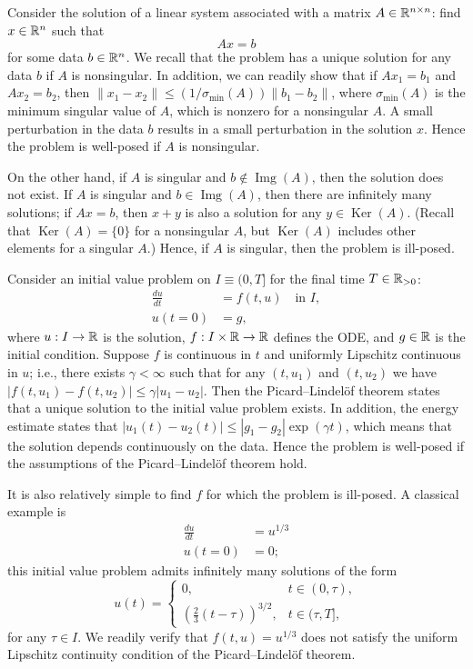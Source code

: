 \begin{example}
    Consider the solution of a linear system associated with a matrix $A \in \mathbb{R}^{n \times n}$: find $x \in \mathbb{R}^n$ such that
    \[Ax = b\]
    for some data $b \in \mathbb{R}^n$. We recall that the problem has a unique solution for any data $b$ if $A$ is nonsingular. In addition, we can readily show that if $Ax_1 = b_1$ and $Ax_2 = b_2$, then $\|x_1 - x_2\| \leq (1/\sigma_{\min}(A)) \|b_1 - b_2\|$, where $\sigma_{\min}(A)$ is the minimum singular value of $A$, which is nonzero for a nonsingular $A$. A small perturbation in the data $b$ results in a small perturbation in the solution $x$. Hence the problem is well-posed if $A$ is nonsingular.

    On the other hand, if $A$ is singular and $b \notin \operatorname{Img}(A)$, then the solution does not exist. If $A$ is singular and $b \in \operatorname{Img}(A)$, then there are infinitely many solutions; if $Ax = b$, then $x + y$ is also a solution for any $y \in \operatorname{Ker}(A)$. (Recall that $\operatorname{Ker}(A) = \{0\}$ for a nonsingular $A$, but $\operatorname{Ker}(A)$ includes other elements for a singular $A$.) Hence, if $A$ is singular, then the problem is ill-posed.
\end{example}

\begin{example}
    Consider an initial value problem on $I \equiv (0, T]$ for the final time $T \in \mathbb{R}_{>0}$:
    \begin{align*}
        \frac{du}{dt} &= f(t, u) \quad \text{in } I, \\
        u(t = 0) &= g,
    \end{align*}
    where $u : I \to \mathbb{R}$ is the solution, $f : I \times \mathbb{R} \to \mathbb{R}$ defines the ODE, and $g \in \mathbb{R}$ is the initial condition. Suppose $f$ is continuous in $t$ and uniformly Lipschitz continuous in $u$; i.e., there exists $\gamma < \infty$ such that for any $(t, u_1)$ and $(t, u_2)$ we have $|f(t, u_1) - f(t, u_2)| \leq \gamma |u_1 - u_2|$. Then the Picard--Lindel\"of theorem states that a unique solution to the initial value problem exists. In addition, the energy estimate states that $|u_1(t) - u_2(t)| \leq |g_1 - g_2| \exp(\gamma t)$, which means that the solution depends continuously on the data. Hence the problem is well-posed if the assumptions of the Picard--Lindel\"of theorem hold.

    It is also relatively simple to find $f$ for which the problem is ill-posed. A classical example is
    \begin{align*}
        \frac{du}{dt} &= u^{1/3} \\
        u(t = 0) &= 0;
    \end{align*}
    this initial value problem admits infinitely many solutions of the form
    \[u(t) = \begin{cases} 0, & t \in (0, \tau), \\ \left(\frac{2}{3}(t - \tau)\right)^{3/2}, & t \in (\tau, T], \end{cases}\]
    for any $\tau \in I$. We readily verify that $f(t, u) = u^{1/3}$ does not satisfy the uniform Lipschitz continuity condition of the Picard--Lindel\"of theorem.
\end{example}
